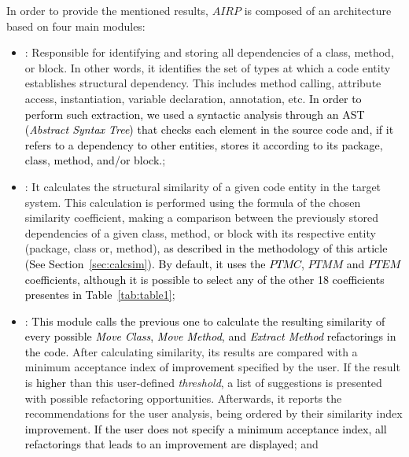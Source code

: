 \documentclass[smallextended,natbib]{svjour3}
\begin{document}
{In order to provide the mentioned results, $AIRP$ is composed of an architecture based on four main modules:

\begin{itemize}
\item {}: Responsible for identifying and storing all dependencies of a class, method, or block. In other words, it identifies the set of types at which a code entity establishes structural dependency. This includes method calling, attribute access, instantiation, variable declaration, annotation, etc. \textcolor{black}{In order to perform such extraction, we used a syntactic analysis through an AST (\textit{Abstract Syntax Tree}) that checks each element in the source code and, if it refers to a dependency to other entities, stores it according to its package, class, method, and/or block.};\\[-0.2cm]

\item {}: It calculates the structural similarity of a given code entity in the target system. This calculation is performed using the formula of the chosen similarity coefficient, making a comparison between the previously stored dependencies of a given class, method, or block with its respective entity (package, class or, method)\textcolor{black}{, as described in the methodology of this article (See Section~\ref{sec:calcsim}). By default, it uses the $PTMC$, $PTMM$ and $PTEM$ coefficients, although it is possible to select any of the other 18 coefficients presentes in Table~\ref{tab:table1}};\\[-0.2cm]

\item {}: \textcolor{black}{This module calls the previous one to calculate the resulting similarity of every possible \textit{Move Class}, \textit{Move Method}, and \textit{Extract Method} refactorings in the code.} After calculating similarity, its results are compared with a minimum acceptance index \textcolor{black}{of improvement} specified by the user. If the result is \textcolor{black}{higher} than this user-defined {\em threshold}, a list of suggestions is presented with possible refactoring opportunities. Afterwards, it reports the recommendations for the user analysis, being ordered by their similarity index \textcolor{black}{improvement. If the user does not specify a minimum acceptance index, all refactorings that leads to an improvement are displayed}; and\\[-0.2cm]


\end{itemize}}
\end{document}
